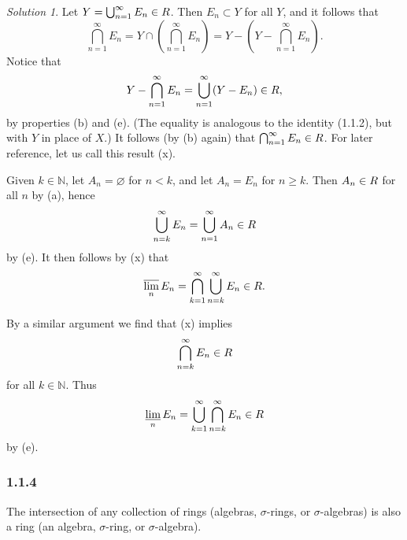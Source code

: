 \documentclass{report}
\newcommand{\bb}[1]{\mathbb{#1}}
\let\sc\relax
\newcommand{\sc}[1]{\mathscr{#1}}
\theoremstyle{remark}
\newtheorem*{solution}{Solution}
\begin{document}
\begin{solution}
  Let $Y = \bigcup_{n=1}^\infty E_n \in \sc R$. Then $E_n \subset Y$ for all $Y$, and it follows that
  \begin{equation*}
    \bigcap_{n=1}^\infty E_n = Y \cap \left( \bigcap_{n=1}^\infty E_n \right) = Y - \left( Y - \bigcap_{n=1}^\infty E_n \right).
  \end{equation*}
  Notice that
  \begin{equation*}
    Y - \bigcap_{n=1}^\infty E_n = \bigcup_{n=1}^\infty (Y - E_n) \in \sc R,
  \end{equation*}
  by properties (b) and (e). (The equality is analogous to the identity (1.1.2), but with $Y$ in place of $X$.) It follows (by (b) again) that $\bigcap_{n=1}^\infty E_n \in \sc R$. For later reference, let us call this result (x).

  Given $k \in \bb N$, let $A_n = \varnothing$ for $n < k$, and let $A_n = E_n$ for $n \ge k$. Then $A_n \in \sc R$ for all $n$ by (a), hence
  \begin{equation*}
    \bigcup_{n=k}^\infty E_n = \bigcup_{n=1}^\infty A_n \in \sc R
  \end{equation*}
  by (e). It then follows by (x) that
  \begin{equation*}
    \varlimsup_n E_n = \bigcap_{k=1}^\infty \bigcup_{n=k}^\infty E_n \in \sc R.
  \end{equation*}

  By a similar argument we find that (x) implies
  \begin{equation*}
    \bigcap_{n=k}^\infty E_n \in \sc R
  \end{equation*}
  for all $k \in \bb N$. Thus
  \begin{equation*}
    \varliminf_n E_n = \bigcup_{k=1}^\infty \bigcap_{n=k}^\infty E_n \in \sc R
  \end{equation*}
  by (e).
\end{solution}

\subsubsection*{1.1.4}
The intersection of any collection of rings (algebras, $\sigma$-rings, or $\sigma$-algebras) is also a ring (an algebra, $\sigma$-ring, or $\sigma$-algebra).
\end{document}
